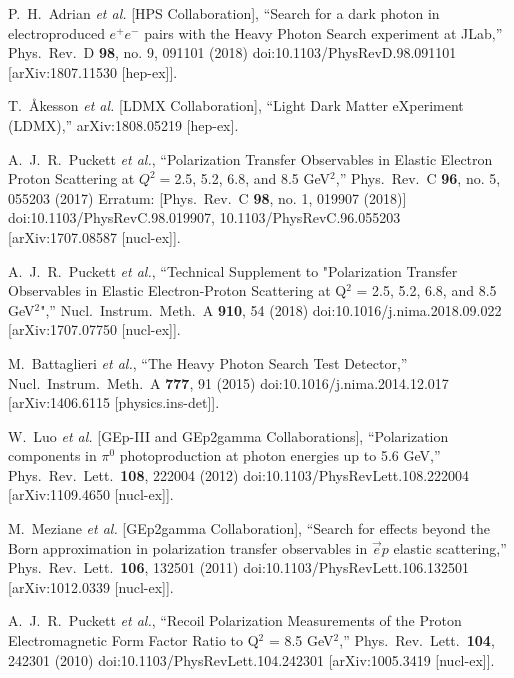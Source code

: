 \documentclass[11pt]{article}
\begin{document}
    \begin{thebibliography}{99}

            P.~H.~Adrian {\it et al.} [HPS Collaboration],
            ``Search for a dark photon in electroproduced $e^{+}e^{-}$ pairs with the Heavy Photon Search experiment at JLab,''
            Phys.\ Rev.\ D {\bf 98}, no. 9, 091101 (2018)
            doi:10.1103/PhysRevD.98.091101
            [arXiv:1807.11530 [hep-ex]].
        
            T.~Åkesson {\it et al.} [LDMX Collaboration],
            ``Light Dark Matter eXperiment (LDMX),''
            arXiv:1808.05219 [hep-ex].

            A.~J.~R.~Puckett {\it et al.},
            ``Polarization Transfer Observables in Elastic Electron Proton Scattering at $Q^2 = $2.5, 5.2, 6.8, and 8.5 GeV$^2$,''
            Phys.\ Rev.\ C {\bf 96}, no. 5, 055203 (2017)
            Erratum: [Phys.\ Rev.\ C {\bf 98}, no. 1, 019907 (2018)]
            doi:10.1103/PhysRevC.98.019907, 10.1103/PhysRevC.96.055203
            [arXiv:1707.08587 [nucl-ex]].

            A.~J.~R.~Puckett {\it et al.},
            ``Technical Supplement to "Polarization Transfer Observables in Elastic Electron-Proton Scattering at Q$^2$ = 2.5, 5.2, 6.8, and 8.5 GeV$^2$",''
            Nucl.\ Instrum.\ Meth.\ A {\bf 910}, 54 (2018)
            doi:10.1016/j.nima.2018.09.022
            [arXiv:1707.07750 [nucl-ex]].

            M.~Battaglieri {\it et al.},
            ``The Heavy Photon Search Test Detector,''
            Nucl.\ Instrum.\ Meth.\ A {\bf 777}, 91 (2015)
            doi:10.1016/j.nima.2014.12.017
            [arXiv:1406.6115 [physics.ins-det]].

            W.~Luo {\it et al.} [GEp-III and GEp2gamma Collaborations],
            ``Polarization components in $\pi^{0}$ photoproduction at photon energies up to 5.6 GeV,''
            Phys.\ Rev.\ Lett.\  {\bf 108}, 222004 (2012)
            doi:10.1103/PhysRevLett.108.222004
            [arXiv:1109.4650 [nucl-ex]].

            M.~Meziane {\it et al.} [GEp2gamma Collaboration],
            ``Search for effects beyond the Born approximation in polarization transfer observables in $\vec{e}p$ elastic scattering,''
            Phys.\ Rev.\ Lett.\  {\bf 106}, 132501 (2011)
            doi:10.1103/PhysRevLett.106.132501
            [arXiv:1012.0339 [nucl-ex]].

            A.~J.~R.~Puckett {\it et al.},
            ``Recoil Polarization Measurements of the Proton Electromagnetic Form Factor Ratio to Q$^2$ = 8.5 GeV$^2$,''
            Phys.\ Rev.\ Lett.\  {\bf 104}, 242301 (2010)
            doi:10.1103/PhysRevLett.104.242301
            [arXiv:1005.3419 [nucl-ex]].

    \end{thebibliography}
    \nocite{*}
\end{document}
